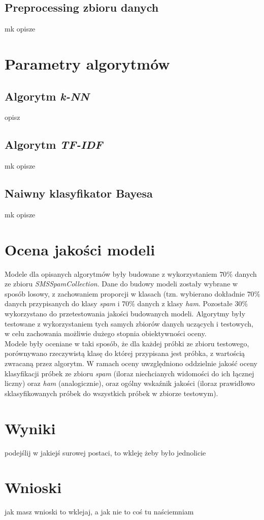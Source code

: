 \documentclass[a4paper,12pt]{article}
\begin{document}
\subsection{Preprocessing zbioru danych}

mk opisze

\section{Parametry algorytmów} %

\subsection{Algorytm \textit{k-NN}}

opisz

\subsection{Algorytm \textit{TF-IDF}}

mk opisze

\subsection{Naiwny klasyfikator Bayesa}

mk opisze

\section{Ocena jakości modeli} %

Modele dla opisanych algorytmów były budowane z wykorzystaniem $70\%$ danych ze zbioru \textit{SMSSpamCollection}. Dane do budowy modeli zostały
wybrane w sposób losowy, z zachowaniem proporcji w klasach (tzn. wybierano dokładnie $70\%$ danych przypisanych do klasy \textit{spam} i $70\%$ 
danych z klasy \textit{ham}. Pozostałe $30\%$ wykorzystano do przetestowania jakości budowanych modeli. Algorytmy były testowane z wykorzystaniem
tych samych zbiorów danych uczących i testowych, w celu zachowania możliwie dużego stopnia obiektywności oceny.\\

Modele były oceniane w taki sposób, że dla każdej próbki ze zbioru testowego, porównywano rzeczywistą klasę do której przypisana jest próbka, z
wartością zwracaną przez algorytm. W ramach oceny uwzględniono oddzielnie jakość oceny klasyfikacji próbek ze zbioru \textit{spam} (iloraz niechcianych widomości do ich łącznej liczny) oraz \textit{ham} (analogicznie), oraz ogólny wskaźnik jakości (iloraz prawidłowo sklasyfikowanych próbek do wszystkich próbek w zbiorze testowym).

\section{Wyniki}

podejślij w jakiejś surowej postaci, to wkleję żeby było jednolicie

\section{Wnioski}

jak masz wnioski to wklejaj, a jak nie to coś tu naściemniam
\end{document}
